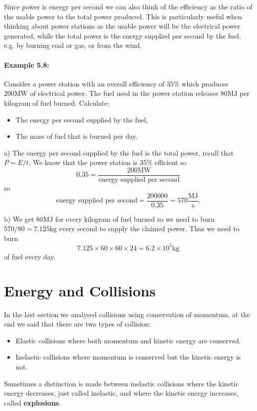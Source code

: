 Since power is energy per second we can also think of the efficiency as the ratio of the usable power to the total power produced. This is particularly useful when thinking about power stations as the usable power will be the electrical power generated, while the total power is the energy supplied per second by the fuel, e.g. by burning coal or gas, or from the wind.

\paragraph{Example 5.8:} Consider a power station with an overall efficiency of $35\%$ which produces $200\text{MW}$ of electrical power. The fuel used in the power station releases $80\text{MJ}$ per kilogram of fuel burned. Calculate:
\begin{itemize}
\setlength{\itemsep}{-5pt}
    \item[a)] The energy per second supplied by the fuel,
    \item[b)] The mass of fuel that is burned per day.
\end{itemize} 

a) The energy per second supplied by the fuel is the total power, recall that $P=E/t$. We know that the power station is $35\%$ efficient so
\begin{equation*}
0.35=\frac{200\text{MW}}{\text{energy supplied per second}}
\end{equation*}
so
\begin{equation*}
\text{energy supplied per second}=\frac{200000}{0.35}=570\frac{\text{MJ}}{\text{s}}.
\end{equation*}

b) We get $80\text{MJ}$ for every kilogram of fuel burned so we need to burn $570/80=7.125\text{kg}$ every second to supply the claimed power. Thus we need to burn 
\begin{equation*}
7.125\times 60\times 60\times 24=6.2\times10^{5}\text{kg}
\end{equation*}
of fuel every day.


\section{Energy and Collisions}
In the last section we analysed collisions using conservation of momentum, at the end we said that there are two types of collision:
\begin{itemize}
\setlength{\itemsep}{-5pt}
    \item Elastic collisions where both momentum and kinetic energy are conserved.
    \item Inelastic collisions where momentum is conserved but the kinetic energy is not.
\end{itemize} 
Sometimes a distinction is made between inelastic collisions where the kinetic energy decreases, just called inelastic, and where the kinetic energy increases, called \textbf{explosions}. \\

